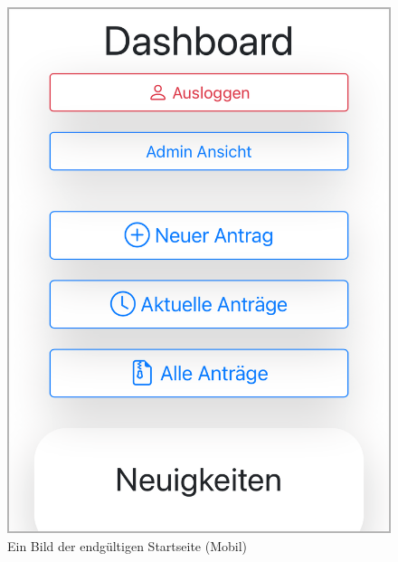 \begin{figure}[H]
	\centering
	\includegraphics[width=0.4\linewidth]{images/ldehner_implementierung/dashboard_mobile}
	\caption[Dashboard Mobil Seite]{Ein Bild der endgültigen Startseite (Mobil)}
	\label{fig:dashboardmobile}
\end{figure}

